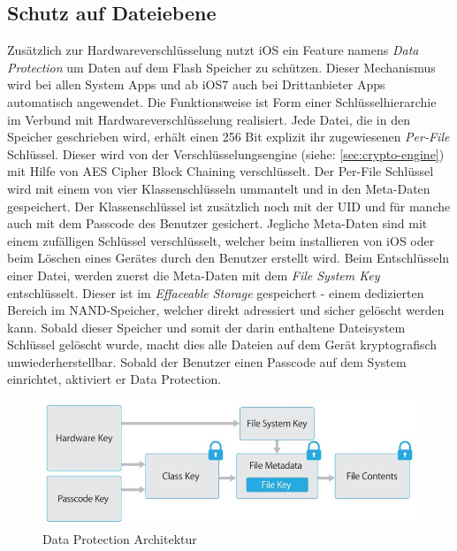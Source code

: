 	\subsection{Schutz auf Dateiebene}
		Zusätzlich zur Hardwareverschlüsselung nutzt iOS ein Feature namens \textsl{Data
		Protection} um Daten auf dem Flash Speicher zu schützen. Dieser Mechanismus
		wird bei allen System Apps und ab iOS7 auch bei Drittanbieter Apps
		automatisch angewendet. Die Funktionsweise ist Form einer Schlüsselhierarchie
		im Verbund mit Hardwareverschlüsselung realisiert. Jede Datei, die in den
		Speicher geschrieben wird, erhält einen 256 Bit explizit ihr zugewiesenen
		\textsl{Per-File} Schlüssel. Dieser wird von der
		Verschlüsselungsengine (siehe: \ref{sec:crypto-engine}) mit Hilfe von
		AES Cipher Block Chaining verschlüsselt. Der Per-File Schlüssel wird mit
		einem von vier Klassenschlüsseln ummantelt und in den Meta-Daten gespeichert.
		Der Klassenschlüssel ist zusätzlich noch mit der UID und für manche auch mit
		dem Passcode des Benutzer gesichert. Jegliche Meta-Daten sind mit einem
		zufälligen Schlüssel verschlüsselt, welcher beim installieren von iOS oder
		beim Löschen eines Gerätes durch den Benutzer erstellt wird. Beim
		Entschlüsseln einer Datei, werden zuerst die Meta-Daten mit dem \textsl{File
		System Key} entschlüsselt. Dieser ist im \textsl{Effaceable Storage}
		gespeichert - einem dedizierten Bereich im NAND-Speicher, welcher direkt
		adressiert und sicher gelöscht werden kann.
		Sobald dieser Speicher und somit der darin enthaltene Dateisystem Schlüssel
		gelöscht wurde, macht dies alle Dateien auf dem Gerät kryptografisch
		unwiederherstellbar. Sobald der Benutzer einen Passcode auf dem System
		einrichtet, aktiviert er Data Protection.
		\begin{figure}[h]
			\centering
			\includegraphics[width=0.9\linewidth]{ios/media/data-protection.jpg}
			\caption{Data Protection Architektur 
			\cite[S.10]{iOSSecurityApr2015}}
			\label{fig:data-protection}
		\end{figure}
